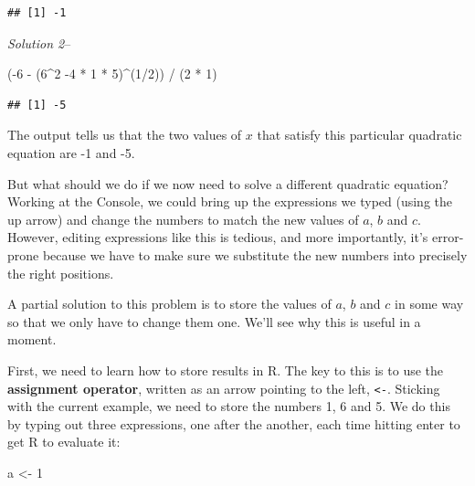 \documentclass[
]{book}
\newenvironment{Shaded}{\begin{snugshade}}{\end{snugshade}}
\newcommand{\DecValTok}[1]{\textcolor[rgb]{0.00,0.00,0.81}{#1}}
\newcommand{\NormalTok}[1]{#1}
\newcommand{\OtherTok}[1]{\textcolor[rgb]{0.56,0.35,0.01}{#1}}
\newcommand{\SpecialCharTok}[1]{\textcolor[rgb]{0.00,0.00,0.00}{#1}}
\begin{document}
\begin{verbatim}
## [1] -1
\end{verbatim}

\emph{Solution 2}--

\begin{Shaded}
\begin{Highlighting}[]
\NormalTok{(}\SpecialCharTok{{-}}\DecValTok{6} \SpecialCharTok{{-}}\NormalTok{ (}\DecValTok{6}\SpecialCharTok{\^{}}\DecValTok{2} \SpecialCharTok{{-}}\DecValTok{4} \SpecialCharTok{*} \DecValTok{1} \SpecialCharTok{*} \DecValTok{5}\NormalTok{)}\SpecialCharTok{\^{}}\NormalTok{(}\DecValTok{1}\SpecialCharTok{/}\DecValTok{2}\NormalTok{)) }\SpecialCharTok{/}\NormalTok{ (}\DecValTok{2} \SpecialCharTok{*} \DecValTok{1}\NormalTok{)}
\end{Highlighting}
\end{Shaded}

\begin{verbatim}
## [1] -5
\end{verbatim}

The output tells us that the two values of \(x\) that satisfy this particular quadratic equation are -1 and -5.

But what should we do if we now need to solve a different quadratic equation? Working at the Console, we could bring up the expressions we typed (using the up arrow) and change the numbers to match the new values of \(a\), \(b\) and \(c\). However, editing expressions like this is tedious, and more importantly, it's error-prone because we have to make sure we substitute the new numbers into precisely the right positions.

A partial solution to this problem is to store the values of \(a\), \(b\) and \(c\) in some way so that we only have to change them one. We'll see why this is useful in a moment.

First, we need to learn how to store results in R. The key to this is to use the \textbf{assignment operator}, written as an arrow pointing to the left, \texttt{\textless{}-}. Sticking with the current example, we need to store the numbers 1, 6 and 5. We do this by typing out three expressions, one after the another, each time hitting enter to get R to evaluate it:

\begin{Shaded}
\begin{Highlighting}[]
\NormalTok{a }\OtherTok{\textless{}{-}} \DecValTok{1}
\end{Highlighting}
\end{Shaded}
\end{document}
